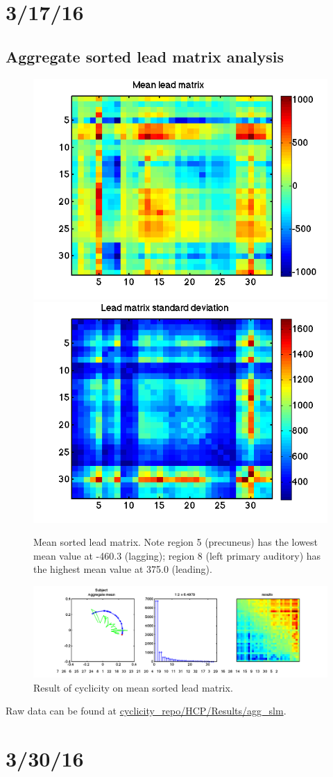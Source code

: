 \documentclass[11pt]{article}
\begin{document}
\section{3/17/16}
\subsection{Aggregate sorted lead matrix analysis}
\begin{figure}[H]
\centering
\includegraphics[width=.49\textwidth]{pictures/mean_slm.png}
\includegraphics[width=.49\textwidth]{pictures/std_slm.png}
\caption{Mean sorted lead matrix. Note region 5 (precuneus) has the lowest mean value at -460.3 (lagging); region 8 (left primary auditory) has the highest mean value at 375.0 (leading).}
\includegraphics[width=\textwidth]{pictures/agg_mean_cyclicity_fig.png}
\caption{Result of cyclicity on mean sorted lead matrix.}
\end{figure}
Raw data can be found at \href{https://github.com/eschlaf2/cyclicity_repo/tree/master/HCP/Results/agg_slm}{cyclicity\_repo/HCP/Results/agg\_slm}.

\section{3/30/16}
\end{document}
